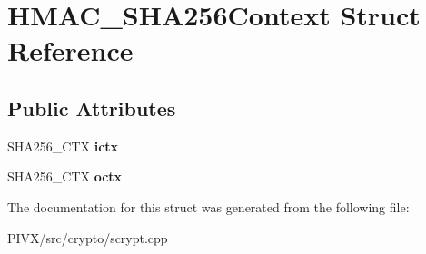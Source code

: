 \hypertarget{struct_h_m_a_c___s_h_a256_context}{}\section{H\+M\+A\+C\+\_\+\+S\+H\+A256\+Context Struct Reference}
\label{struct_h_m_a_c___s_h_a256_context}
\subsection*{Public Attributes}
\begin{DoxyCompactItemize}
\item 
\mbox{\label{struct_h_m_a_c___s_h_a256_context_a3433296fae8500c793388994de730f3c}} 
S\+H\+A256\+\_\+\+C\+TX {\bfseries ictx}
\item 
\mbox{\label{struct_h_m_a_c___s_h_a256_context_a699abe00837406f312a95226741137f4}} 
S\+H\+A256\+\_\+\+C\+TX {\bfseries octx}
\end{DoxyCompactItemize}


The documentation for this struct was generated from the following file\+:\begin{DoxyCompactItemize}
\item 
P\+I\+V\+X/src/crypto/scrypt.\+cpp\end{DoxyCompactItemize}
